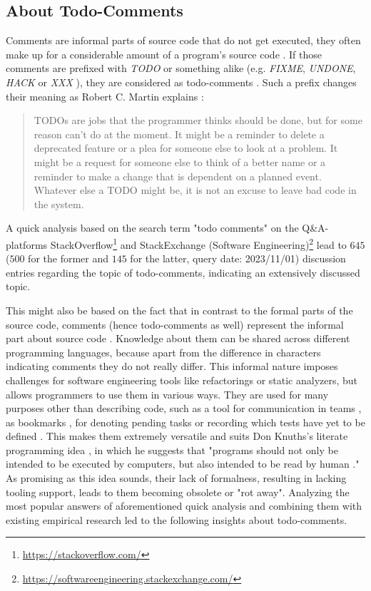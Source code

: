 \subsection{About Todo-Comments}
\label{sec:introduction-about-todo-comments}
Comments are informal parts of source code that do not get executed, they often make up for a considerable amount of a program's source code \cite{nie_natural_2018}.
If those comments are prefixed with \emph{TODO} or something alike (e.g. \emph{FIXME}, \emph{UNDONE}, \emph{HACK} or \emph{XXX} \cite{storey_how_2009}), they are considered as todo-comments \cite{ying_source_2005}.
Such a prefix changes their meaning as Robert C. Martin explains \cite[p. 59]{martin_clean_2009}:
%
\begin{quote}
    TODOs are jobs that the programmer thinks should be done, but for some reason can't do at the moment. It might be a reminder to delete a deprecated feature or a plea for someone else to look at a problem. It might be a request for someone else to think of a better name or a reminder to make a change that is dependent on a planned event. Whatever else a TODO might be, it is not an excuse to leave bad code in the system.
\end{quote}
%
A quick analysis based on the search term "todo comments" on the Q\&A-platforms StackOverflow\footnote{\url{https://stackoverflow.com/}} and StackExchange (Software Engineering)\footnote{\url{https://softwareengineering.stackexchange.com/}} lead to $645$ ($500$ for the former and $145$ for the latter, query date: 2023/11/01) discussion entries regarding the topic of todo-comments, indicating an extensively discussed topic.

This might also be based on the fact that in contrast to the formal parts of the source code, comments (hence todo-comments as well) represent the informal part about source code \cite{ying_source_2005, nie_framework_2019, sridhara_automatically_2016, storey_todo_2008}.
Knowledge about them can be shared across different programming languages, because apart from the difference in characters indicating comments they do not really differ.
This informal nature imposes challenges for software engineering tools like refactorings or static analyzers, but allows programmers to use them in various ways.
They are used for many purposes other than describing code, such as a tool for communication in teams \cite{ying_source_2005}, as bookmarks \cite{storey_how_2009}, for denoting pending tasks \citeauthor{sridhara_automatically_2016} or recording which tests have yet to be defined \cite{storey_todo_2008}.
This makes them extremely versatile and suits Don Knuths's literate programming idea \cite{knuth_literate_1984}, in which he suggests that "programs should not only be intended to be executed by computers, but also intended to be read by human \cite{ying_source_2005}."
As promising as this idea sounds, their lack of formalness, resulting in lacking tooling support, leads to them becoming obsolete or "rot away".
Analyzing the most popular answers of aforementioned quick analysis \cite{...} and combining them with existing empirical \cite{ying_source_2005, nie_framework_2019, storey_how_2009} research led to the following insights about todo-comments.

